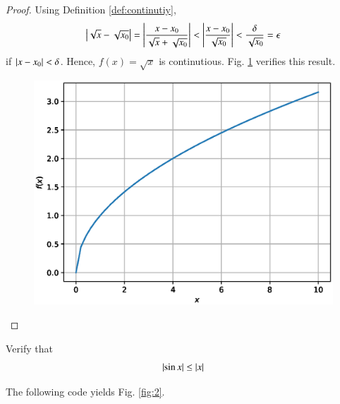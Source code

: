 \documentclass[journal,12pt,twocolumn]{IEEEtran}
\begin{document}
\begin{proof}

Using Definition \ref{def:continutiy},
\begin{align}
\left\vert\sqrt{x}-\sqrt{x_0}\right\vert = \left\vert\frac{x-x_0}{\sqrt{x}+\sqrt{x_0}}\right\vert < \left\vert\frac{x-x_0}{\sqrt{x_0}}\right\vert < \frac{\delta}{\sqrt{x_0}} = \epsilon
\end{align}
if $\left\vert x-x_0\right\vert < \delta$.  Hence, $f(x) = \sqrt{x}$ is continutious.  Fig. \ref{fig:1} verifies this result.


%
\begin{figure}[!ht]
\begin{center}
\includegraphics[width=\columnwidth]{./figs/1.eps}
\end{center}

\label{fig:1}	
\end{figure}
\end{proof}
\begin{problem}

Verify that
\begin{equation}
\left\vert\sin x\right\vert \leq \left\vert x\right\vert
\end{equation}
\end{problem}
\solution The following code yields Fig. \ref{fig:2}.

%
\end{document}
